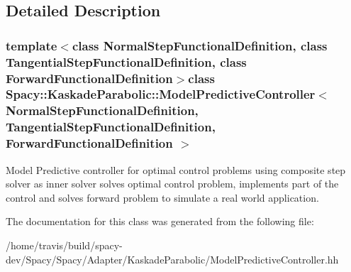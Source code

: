 \subsection{Detailed Description}
\subsubsection*{template$<$class Normal\-Step\-Functional\-Definition, class Tangential\-Step\-Functional\-Definition, class Forward\-Functional\-Definition$>$class Spacy\-::\-Kaskade\-Parabolic\-::\-Model\-Predictive\-Controller$<$ Normal\-Step\-Functional\-Definition, Tangential\-Step\-Functional\-Definition, Forward\-Functional\-Definition $>$}

Model Predictive controller for optimal control problems using composite step solver as inner solver solves optimal control problem, implements part of the control and solves forward problem to simulate a real world application. 

The documentation for this class was generated from the following file\-:\begin{DoxyCompactItemize}
\item 
/home/travis/build/spacy-\/dev/\-Spacy/\-Spacy/\-Adapter/\-Kaskade\-Parabolic/Model\-Predictive\-Controller.\-hh\end{DoxyCompactItemize}
